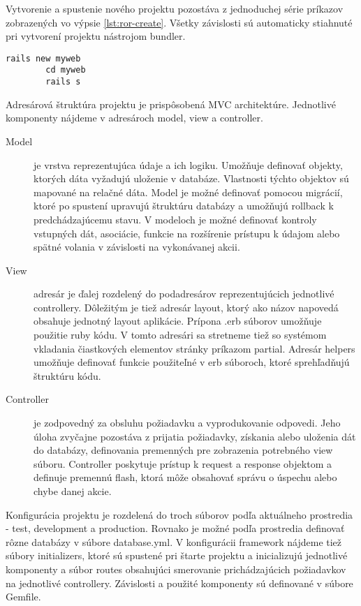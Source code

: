 	Vytvorenie a spustenie nového projektu pozostáva z jednoduchej série príkazov zobrazených vo výpsie \ref{lst:ror-create}. Všetky závislosti sú automaticky stiahnuté pri vytvorení projektu nástrojom bundler.
	\begin{lstlisting}[label=lst:ror-create,caption=Príklad vytvorenia a spustenia projektu v Ruby On Rails]
		rails new myweb
		cd myweb
		rails s
	\end{lstlisting}

	Adresárová štruktúra projektu je prispôsobená MVC architektúre. Jednotlivé komponenty nájdeme v adresároch model, view a controller.
	\begin{description}
		\item[Model] je vrstva reprezentujúca údaje a ich logiku. Umožňuje definovať objekty, ktorých dáta vyžadujú uloženie v databáze. Vlastnosti týchto objektov sú mapované na relačné dáta. Model je možné definovať pomocou migrácií, ktoré po spustení upravujú štruktúru databázy a umožňujú rollback k predchádzajúcemu stavu. V modeloch je možné definovať kontroly vstupných dát, asociácie, funkcie na rozšírenie prístupu k údajom alebo spätné volania v závislosti na vykonávanej akcii.
		\item[View] adresár je ďalej rozdelený do podadresárov reprezentujúcich jednotlivé controllery. Dôležitým je tiež adresár layout, ktorý ako názov napovedá obsahuje jednotný layout aplikácie. Prípona .erb súborov umožňuje použitie ruby kódu. V tomto adresári sa stretneme tiež so systémom vkladania čiastkových elementov stránky príkazom partial. Adresár helpers umožňuje definovať funkcie použiteľné v erb súboroch, ktoré sprehľadňujú štruktúru kódu.
		\item[Controller] je zodpovedný za obsluhu požiadavku a vyprodukovanie odpovedi. Jeho úloha zvyčajne pozostáva z prijatia požiadavky, získania alebo uloženia dát do databázy, definovania premenných pre zobrazenia potrebného view súboru. Controller poskytuje prístup k request a response objektom a definuje premennú flash, ktorá môže obsahovať správu o úspechu alebo chybe danej akcie.
	\end{description}
	
	Konfigurácia projektu je rozdelená do troch súborov podľa aktuálneho prostredia - test, development a production. Rovnako je možné podľa prostredia definovať rôzne databázy v súbore database.yml.
	V konfigurácii framework nájdeme tiež súbory initializers, ktoré sú spustené pri štarte projektu a inicializujú jednotlivé komponenty a súbor routes obsahujúci smerovanie prichádzajúcich požiadavkov na jednotlivé controllery. Závislosti a použité komponenty sú definované v súbore Gemfile.
	
